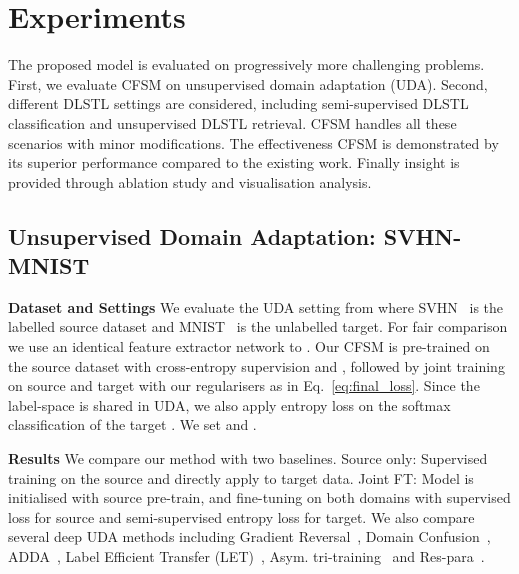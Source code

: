\documentclass[letterpaper]{article} \usepackage{aaai19}  \usepackage{times}  \usepackage{helvet}  \usepackage{courier}  \usepackage{url}  \usepackage{graphicx}
\newcommand{\keypoint}[1]{\noindent\textbf{#1}\quad}
\begin{document}
\section{Experiments}\label{Sec:Exp}
\begin{comment}
\textcolor{blue}{Different Transfer Learning Experiments should be presented, from easy to hard. 1. Unsupervised transfer learning with disjoint label space (Person Re-ID and Sketch-photo). 2. Unsupervised transfer learning with joint label space (UDA); 3.Semi-supervised transfer learning with disjoint label space (SVHN 0-4  MNIST 5-9); }

\textcolor{blue}{different experiments with different setting. There should be an '\textbf{Model Details}' paragraph in each setting.}

\textcolor{blue}{Terminology consistency.}
\end{comment}
The proposed model is evaluated on progressively more challenging problems.   
First, we evaluate CFSM on unsupervised domain adaptation (UDA).
Second, different DLSTL settings are considered, including semi-supervised DLSTL classification and unsupervised DLSTL retrieval. CFSM handles all these  scenarios with minor modifications. The effectiveness CFSM is demonstrated by its superior performance compared to the existing work. 
Finally insight is provided through ablation study and visualisation analysis.


\subsection{Unsupervised Domain Adaptation: SVHN-MNIST}

\keypoint{Dataset and Settings} We evaluate the UDA setting from \cite{ganin2016domain} where SVHN~\cite{svhn_data} is the labelled source dataset and MNIST~\cite{mnist_data} is the unlabelled target. For fair comparison we use an identical feature extractor network to  \cite{label_eff_open_da_2017}. Our CFSM is pre-trained on the source dataset with cross-entropy supervision and , followed by joint training on source and target with our regularisers as in Eq.~\ref{eq:final_loss}. Since the label-space is shared in UDA, we also apply entropy loss on the softmax classification of the target \cite{long2016unsupervised}. We set  and . 

\keypoint{Results} We compare our method with two baselines. Source only: Supervised training on the source and directly apply to target data. Joint FT: Model is initialised with source pre-train, and fine-tuning on both domains with supervised loss for source and semi-supervised entropy loss for target. We also compare several deep UDA methods including Gradient Reversal~\cite{ganin2016domain}, Domain Confusion~\cite{tzeng2015simultaneousTransfer}, ADDA~\cite{adversarial_feat_cvpr17}, Label Efficient Transfer (LET)~\cite{label_eff_open_da_2017}, Asym. tri-training~\cite{saito2017asymmetric} and Res-para~\cite{rozantsev2018residual}.
\end{document}
